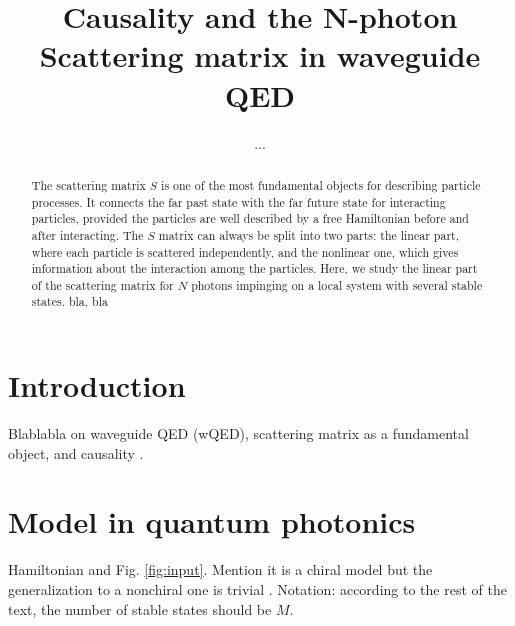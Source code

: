 \documentclass[aps,pra,reprint,amsmath,amssymb]{revtex4-1}
\begin{document}
\title{Causality and the N-photon Scattering matrix in waveguide QED}

\author{...}


\begin{abstract}
The scattering matrix $S$ is one of the most fundamental objects for
describing particle processes. It connects the far past state with the
far future state for interacting particles, provided the particles are well described by a free
Hamiltonian before and after interacting. The $S$ matrix can always be split into two parts: the linear part,
where each particle is scattered independently, and the nonlinear one,
which gives information about the interaction among the
particles. Here, we study the linear part of the scattering matrix for
$N$ photons impinging on a local system with several stable states. 
bla, bla
\end{abstract}



\maketitle


\section{Introduction}

{\color{blue}Blablabla on waveguide QED (wQED), scattering matrix as a fundamental object, and causality \cite{weinberg1995,Xu2016}.}


\section{Model in quantum photonics} 

{\color{blue}Hamiltonian and Fig. \ref{fig:input}. Mention it is a chiral model but the generalization to a nonchiral one is trivial \cite{fan10}. Notation: according to the rest of the text, the number of stable states should be $M$.}
\end{document}
